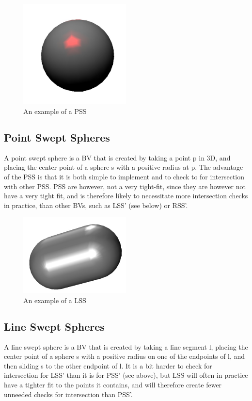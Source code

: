 \begin{figure}
\centering
\includegraphics[width=0.5\textwidth]{figures/pss}
\caption{\label{pss-example}An example of a PSS}
\end{figure}

\subsection{Point Swept Spheres}
A point swept sphere is a BV that is created by taking a point p in 3D, and placing the center point of a sphere s with a positive radius at p. The advantage of the PSS is that it is both simple to implement and to check to for intersection with other PSS. PSS are however, not a very tight-fit, since they are however not have a very tight fit, and is therefore likely to necessitate more intersection checks in practice, than other BVs, such as LSS' (see below) or RSS'.

\begin{figure}
\centering
\includegraphics[width=0.5\textwidth]{figures/lss}
\caption{\label{lss-example}An example of a LSS}
\end{figure}

\subsection{Line Swept Spheres}
A line swept sphere is a BV that is created by taking a line segment l, placing the center point of a sphere s with a positive radius on one of the endpoints of l, and then sliding s to the other endpoint of l. It is a bit harder to check for intersection for LSS' than it is for PSS' (see above), but LSS will often in practice have a tighter fit to the points it contains, and will therefore create fewer unneeded checks for intersection than PSS'.

